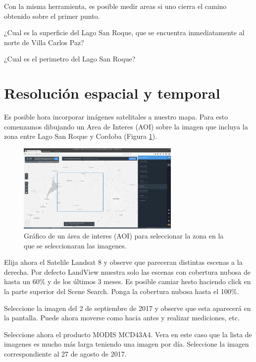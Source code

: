 \documentclass[a4paper,10pt]{article}
\begin{document}
Con la misma herramienta, es posible medir areas si uno cierra el camino obtenido sobre el primer punto.

\begin{que}
    ¿Cual es la superficie del Lago San Roque, que se encuentra inmediatamente al norte de Villa Carlos Paz?
\end{que}

\begin{que}
    ¿Cual es el perimetro del Lago San Roque?
\end{que}

\section{Resolución espacial y temporal}
Es posible hora incorporar imágenes satelitales a nuestro mapa. Para esto comenzamos dibujando un Area de Interes (AOI) sobre la imagen que incluya la zona entre Lago San Roque y Cordoba (Figura \ref{fig:aoi}).

\begin{figure}[h!]
    \centering
    \includegraphics[width=0.7\textwidth]{fig:aoi.png}
    \caption{Gráfico de un área de interes (AOI) para seleccionar la zona en la que se seleccionaran las imagenes.}
    \label{fig:aoi}
\end{figure}

Elija ahora el Satelile Landsat 8 y observe que pareceran distintas escenas a la derecha. Por defecto LandView muestra solo las escenas con cobertura nubosa de hasta un 60\% y de los últimos 3 meses. Es posible camiar hesto haciendo click en la parte superior del Scene Search.  Ponga la cobertura nubosa hasta el 100\%.

Seleccione la imagen del 2 de septiembre de 2017 y observe que esta aparecerá en la pantalla. Puede ahora moverse como hacia antes y realizar mediciones, etc.

Seleccione ahora el producto MODIS MCD43A4. Vera en este caso que la lista de imagenes es mucho más larga teniendo una imagen por día. Seleccione la imagen correspondiente al 27 de agosto de 2017.
\end{document}
